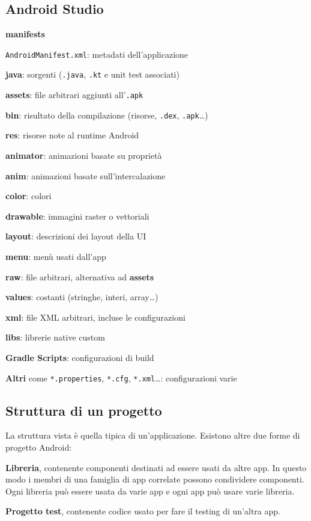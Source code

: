 \documentclass[10pt]{book}
\begin{document}
\subsection{Android Studio}
\begin{list}{}{}
	\item \textbf{manifests}
	\begin{list}{}{}
		\item \texttt{AndroidManifest.xml}: metadati dell'applicazione
	\end{list}
	\item \textbf{java}: sorgenti (\texttt{.java}, \texttt{.kt} e unit test associati)
	\item \textbf{assets}: file arbitrari aggiunti all'\texttt{.apk}
	\item \textbf{bin}: risultato della compilazione (risorse, \texttt{.dex}, \texttt{.apk}\ldots)
	\item \textbf{res}: risorse note al runtime Android
	\begin{list}{}{}
		\item \textbf{animator}: animazioni basate su proprietà
		\item \textbf{anim}: animazioni basate sull'intercalazione
		\item \textbf{color}: colori
		\item \textbf{drawable}: immagini raster o vettoriali
		\item \textbf{layout}: descrizioni dei layout della UI
		\item \textbf{menu}: menù usati dall'app
		\item \textbf{raw}: file arbitrari, alternativa ad \textbf{assets}
		\item \textbf{values}: costanti (stringhe, interi, array\ldots)
		\item \textbf{xml}: file XML arbitrari, incluse le configurazioni
	\end{list}
	\item \textbf{libs}: librerie native custom
	\item \textbf{Gradle Scripts}: configurazioni di build
	\item \textbf{Altri} come \texttt{*.properties}, \texttt{*.cfg}, \texttt{*.xml}\ldots: configurazioni varie
\end{list}
\subsection{Struttura di un progetto}
La struttura vista è quella tipica di un'applicazione. Esistono altre due forme di progetto Android:
\begin{list}{}{}
	\item \textbf{Libreria}, contenente componenti destinati ad essere usati da altre app. In questo modo i membri di una famiglia di app correlate possono condividere componenti. Ogni libreria può essere usata da varie app e ogni app può usare varie libreria.
	\item \textbf{Progetto test}, contenente codice usato per fare il testing di un'altra app.
\end{list}
\end{document}
